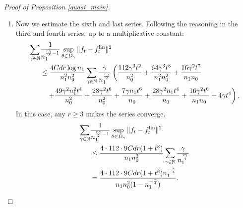 \documentclass{article}
\theoremstyle{definition}
\theoremstyle{remark}
\numberwithin{equation}{section}
\newcommand{\N}{\mathbb{N}}
\newcommand{\lin}{{\textup{lin}}}
\newcommand{\norm}[2]{
    \|#1\|_{#2}
}
\begin{document}
\begin{proof}[Proof of Proposition \ref{quasi_main}]
\begin{enumerate}
    As we did for the fourth series, we can choose $r$ large enough so that the previous series is convergent.
    $r\ge 5$ is sufficient.
    Up to a multiplicative constant:
    \begin{align}
        \sum_{\gamma \in \N}\frac{1}{n_1^{\frac{r\gamma}{2}-1}} \sup_{\theta \in D_\gamma}\norm{y_t-f_t}{}^2 &\le 196\cdot7\cdot 9 Bn_0(1+t^4)\sum_{\gamma \in \N}\frac{1}{n_1^{\frac{r\gamma}{4}}}\\
        &\le \frac{196\cdot7\cdot 9 Bn_0(1+t^4) n_1^{-\frac{r}{4}}}{1-n_1^{-\frac{r}{4}}}.
    \end{align}

    \item Now we estimate the sixth and last series.
    Following the reasoning in the third and fourth series, up to a multiplicative constant:
    \begin{align}
        \sum_{\gamma \in \N}&\frac{1}{n_1^{\frac{r\gamma}{2}-1}} \sup_{\theta \in D_\gamma}\norm{f_t-f^\lin_t}{}^2 \\
        &\le \frac{4Cdr \log n_1}{n_1^2n_0^2}\sum_{\gamma \in \N}\frac{\gamma}{n_1^{\frac{r\gamma}{2}}} \left(\frac{112 \gamma^3 t^2}{n_0^2}+\frac{64 \gamma^3t^8}{n_1^2n_0^2}+\frac{16 \gamma^2t^7}{n_1n_0}\right. \\
            &\left.\quad +\frac{49\gamma^2n_1^2t^4}{n_0^2}+\frac{28\gamma^2t^6}{n_0^2}+\frac{7 \gamma n_1t^6}{n_0}+\frac{28\gamma^2n_1t^4}{n_0}+\frac{16 \gamma^2 t^6}{n_1n_0}+4\gamma t^4\right).
        \end{align}
    In this case, any $r \ge 3$ makes the series converge.
    \begin{align}
        \sum_{\gamma \in \N}&\frac{1}{n_1^{\frac{r\gamma}{2}-1}} \sup_{\theta \in D_\gamma}\norm{f_t-f^\lin_t}{}^2 \\
        &\le \frac{4\cdot 112 \cdot 9 Cdr(1+t^8)}{n_1n_0^2}\sum_{\gamma \in \N}\frac{\gamma}{n_1^{\frac{r\gamma}{4}}} \\
        &=\frac{4\cdot 112 \cdot 9 Cdr(1+t^8)n_1^{-\frac{r}{4}}}{n_1n_0^2(1-n_1^{-\frac{r}{4}})}.
    \end{align}
\end{enumerate}
    

\end{proof}
\end{document}
